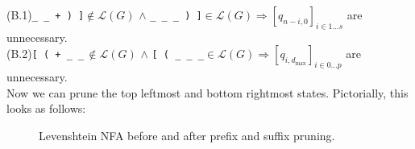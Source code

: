 \documentclass[popl.tex]{subfiles}
\begin{document}
\noindent(B.1)\phantom{..}\texttt{\_ \_ + ) ]}\phantom{.}$\not\in \mathcal{L}(G)$\phantom{...}\phantom{...} $\land$ \phantom{...}\texttt{\_ \_ \_ ) ]}\phantom{...}$\in \mathcal{L}(G)$\phantom{...}\phantom{...}$\Longrightarrow [q_{n-i, 0}]_{i \in 1\ldots s}$ are unnecessary.\\
\noindent(B.2)\phantom{..}\texttt{[ ( + \_ \_}$\hspace{2pt}\not\in \mathcal{L}(G)$\phantom{...}\phantom{...} $\land$ \phantom{...}\texttt{[ ( \_ \_ \_}\phantom{...}$\in \mathcal{L}(G)$\phantom{...}\phantom{...}$\Longrightarrow [q_{i, d_{\max}}]_{i \in 0\ldots p}$ are unnecessary.\\

\noindent Now we can prune the top leftmost and bottom rightmost states. Pictorially, this looks as follows:

\begin{figure}[H]
  \resizebox{0.47\textwidth}{!}{
    
  }
  \resizebox{0.47\textwidth}{!}{
    
  }
  \caption{Levenshtein NFA before and after prefix and suffix pruning.}
\end{figure}\vspace{-0.175cm}
\ifSubfilesClassLoaded{\par\clearpage}{}
\end{document}
